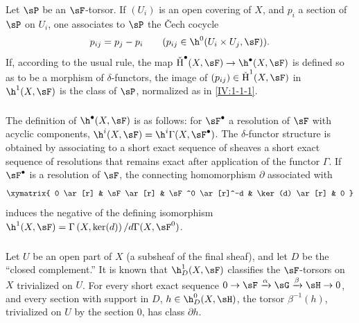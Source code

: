 \documentclass[oneside]{book}
\begin{document}
\subsubsection{}\label{IV:1-1-2}

Let $\sP$ be an $\sF$-torsor. If $(U_i)$ is an open covering of $X$, and
$p_i$ a section of $\sP$ on $U_i$, one associates to $\sP$ the \v{C}ech
cocycle
\[
  p_{i j} = p_j - p_i \qquad \text{($p_{i j}\in \h^0(U_i\times U_j,\sF)$).}
\]
If, according to the usual rule, the map
$\operatorname{\check H}^\bullet(X,\sF)\to \h^\bullet(X,\sF)$ is defined so
as to be a morphism of $\delta$-functors, the image of
$(p_{i j})\in \operatorname{\check H}^1(X,\sF)$ in $\h^1(X,\sF)$ is the class
of $\sP$, normalized as in \ref{IV:1-1-1}.






\subsubsection{}\label{IV:1-1-3}

The definition of $\h^\bullet(X,\sF)$ is as follows: for $\sF^\bullet$ a
resolution of $\sF$ with acyclic components,
$\h^i(X,\sF) = \h^i\Gamma(X,\sF^\bullet)$. The $\delta$-functor structure is
obtained by associating to a short exact sequence of sheaves a short exact
sequence of resolutions that remains exact after application of the functor
$\Gamma$. If $\sF^\bullet$ is a resolution of $\sF$, the connecting
homomorphism $\partial$ associated with
\[\xymatrix{
  0 \ar[r]
    & \sF \ar[r]
    & \sF^0 \ar[r]^-d
    & \ker(d) \ar[r]
    & 0
}\]
induces the negative of the defining isomorphism
$\h^1(X,\sF) = \Gamma\left(X,\ker(d)\right)/d \Gamma(X,\sF^0)$.






\subsubsection{}\label{IV:1-1-4}

Let $U$ be an open part of $X$ (a subsheaf of the final sheaf), and let $D$
be the ``closed complement.'' It is known that $\h_D^1(X,\sF)$ classifies
the $\sF$-torsors on $X$ trivialized on $U$. For every short exact sequence
$0\to \sF\xrightarrow\alpha \sG\xrightarrow\beta\sH\to 0$, and every
section with support in $D$, $h\in\h_D^0(X,\sH)$, the torsor
$\beta^{-1}(h)$, trivialized on $U$ by the section $0$, has class
$\partial h$.
\end{document}
